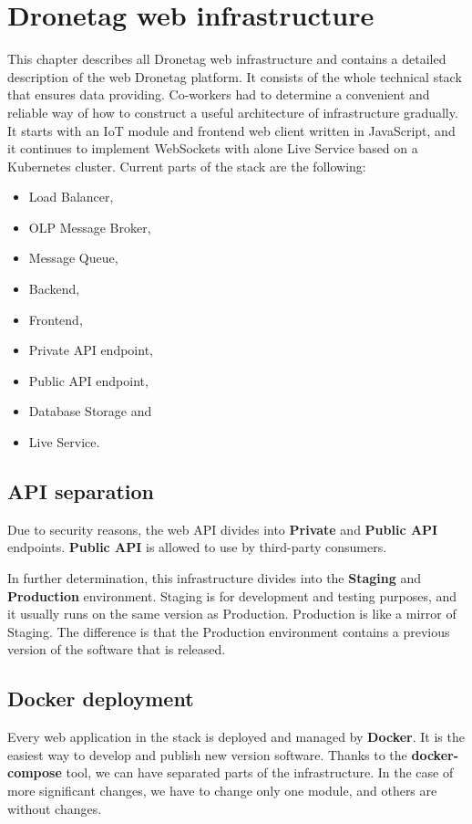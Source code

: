 \chapter{Dronetag web infrastructure}\label{ch:dronetag-web-infrastructure}
This chapter describes all Dronetag web infrastructure and contains a detailed description of the web Dronetag platform.
It consists of the whole technical stack that ensures data providing.
Co-workers had to determine a convenient and reliable way of how to construct a useful architecture of infrastructure gradually.
It starts with an IoT module and frontend web client written in JavaScript, and it continues to implement WebSockets with alone Live Service based on a Kubernetes cluster.
Current parts of the stack are the following:
\begin{itemize}
    \item Load Balancer,
    \item OLP Message Broker,
    \item Message Queue,
    \item Backend,
    \item Frontend,
    \item Private API endpoint,
    \item Public API endpoint,
    \item Database Storage and
    \item Live Service.
\end{itemize}

\section{API separation}\label{sec:api-separation}
Due to security reasons, the web API divides into \textbf{Private} and \textbf{Public API} endpoints.
\textbf{Public API} is allowed to use by third-party consumers.

In further determination, this infrastructure divides into the \textbf{Staging} and \textbf{Production} environment.
Staging is for development and testing purposes, and it usually runs on the same version as Production.
Production is like a mirror of Staging.
The difference is that the Production environment contains a previous version of the software that is released.

\section{Docker deployment}\label{sec:docker-deployment}
Every web application in the stack is deployed and managed by \textbf{Docker}. %
It is the easiest way to develop and publish new version software.
Thanks to the \textbf{docker-compose} tool, we can have separated parts of the infrastructure.
In the case of more significant changes, we have to change only one module, and others are without changes.

